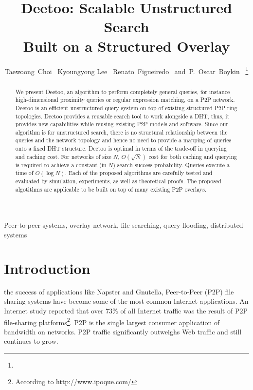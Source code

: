\documentclass[9.5pt,journal,final,finalsubmission,twocolumn]{IEEEtran}
\begin{document}
\title{Deetoo: Scalable Unstructured Search \\
	Built on a Structured Overlay}
\author{ Taewoong~Choi~
         Kyoungyong Lee~
         Renato~Figueiredo~
         and~P.~Oscar~Boykin~%
\thanks{}%
}
\maketitle
\begin{abstract}
We present Deetoo, an algorithm to perform completely general queries,
for instance high-dimensional proximity queries or regular expression
matching, on a P2P network.  
Deetoo is an efficient unstructured query system on top of existing 
structured P2P ring topologies.
Deetoo provides a reusable search tool to work alongside a DHT, thus,
it provides new capabilities while reusing existing P2P models and software.
Since our algorithm is for unstructured search, there is
no structural relationship between the queries and the network topology
and hence no need to provide a mapping of queries onto a fixed DHT structure.
Deetoo is optimal in terms of the trade-off in querying and caching cost.
For networks of size $N$,
$O(\sqrt{N})$ cost for both caching and querying is required to achieve
a constant (in $N$) search success probability.  Queries execute a time
of $O(\log N)$.
Each of the proposed algorithms are carefully tested and evaluated by 
simulation, experiments, as well as theoretical proofs. The proposed 
algotithms are applicable to be built on top of many existing P2P 
overlays.

\end{abstract}

\begin{IEEEkeywords}
Peer-to-peer systems, overlay network, file searching,
query flooding, distributed systems
\end{IEEEkeywords}
\section{Introduction}\label{sec:introduction} 
 the success of applications like 
Napster and Gnutella,
Peer-to-Peer (P2P) file sharing systems have become some of the most
common Internet applications. An Internet study reported
that over 73\% of all Internet traffic was 
the result of P2P file-sharing platforms\footnote{According 
to http://www.ipoque.com/}.
P2P is the single largest consumer application of bandwidth on 
networks. P2P traffic significantly outweighs Web traffic 
and still continues to grow\cite{Goth06b}.
\end{document}
